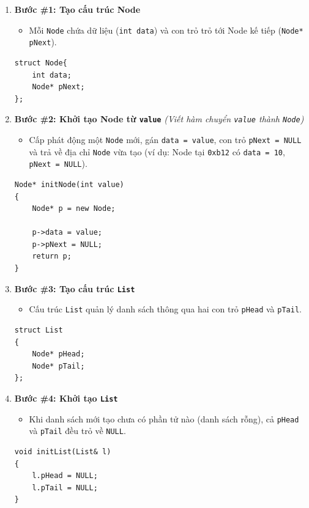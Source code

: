 \documentclass[12pt,a4paper]{article}
\begin{document}
\begin{enumerate}[leftmargin=2.2em, itemsep=0.5em]
    \item \textbf{Bước \#1: Tạo cấu trúc Node}
    \begin{itemize}[itemsep=0.15em]
        \item Mỗi \texttt{Node} chứa dữ liệu (\texttt{int data}) và con trỏ trỏ tới Node kế tiếp (\texttt{Node* pNext}).
    \end{itemize}
\begin{lstlisting}
struct Node{
    int data;
    Node* pNext;
};
\end{lstlisting}

    \item \textbf{Bước \#2: Khởi tạo Node từ \texttt{value}} \textit{(Viết hàm chuyển \texttt{value} thành \texttt{Node})}
    \begin{itemize}[itemsep=0.15em]
        \item Cấp phát động một \texttt{Node} mới, gán \texttt{data = value}, con trỏ \texttt{pNext = NULL} và trả về địa chỉ \texttt{Node} vừa tạo (ví dụ: Node tại \texttt{0xb12} có \texttt{data = 10}, \texttt{pNext = NULL}).
    \end{itemize}
\begin{lstlisting}
Node* initNode(int value)
{
    Node* p = new Node;

    p->data = value;
    p->pNext = NULL;
    return p;
}
\end{lstlisting}

    \needspace{4.5cm}
    \item \textbf{Bước \#3: Tạo cấu trúc \texttt{List}}
    \begin{itemize}[itemsep=0.15em]
        \item Cấu trúc \texttt{List} quản lý danh sách thông qua hai con trỏ \texttt{pHead} và \texttt{pTail}.
    \end{itemize}
\begin{lstlisting}
struct List
{
    Node* pHead;
    Node* pTail;
};
\end{lstlisting}

    \item \textbf{Bước \#4: Khởi tạo \texttt{List}}
    \begin{itemize}[itemsep=0.15em]
        \item Khi danh sách mới tạo chưa có phần tử nào (danh sách rỗng), cả \texttt{pHead} và \texttt{pTail} đều trỏ về \texttt{NULL}.
    \end{itemize}
\begin{lstlisting}
void initList(List& l)
{
    l.pHead = NULL;
    l.pTail = NULL;
}
\end{lstlisting}
\end{enumerate}
\end{document}
